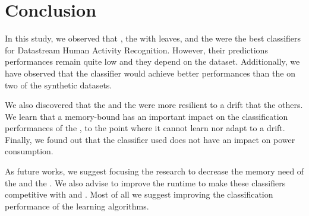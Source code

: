 \section{Conclusion}
In this study, we observed that \naivebayes, the \hoeffdingtree with
\naivebayes leaves, and the \mondrianforest were the best classifiers for
Datastream Human Activity Recognition. However, their predictions performances
remain quite low and they depend on the dataset. Additionally, we have
observed that the \mcnn classifier would achieve better performances than the
\naivebayes on two of the synthetic datasets. 

We also discovered that the \hoeffdingtree and the \mcnns were more resilient
to a drift that the others.  We learn that a memory-bound has an important
impact on the classification performances of the \mondrianforest, to the point
where it cannot learn nor adapt to a drift.  Finally, we found out that the
classifier used does not have an impact on power consumption.

As future works, we suggest focusing the research to decrease the memory need
of the \hoeffdingtree and the \mondrianforest. We also advise to improve the
runtime to make these classifiers competitive with \mcnn and \FNN. Most of all
we suggest improving the classification performance of the learning
algorithms.
